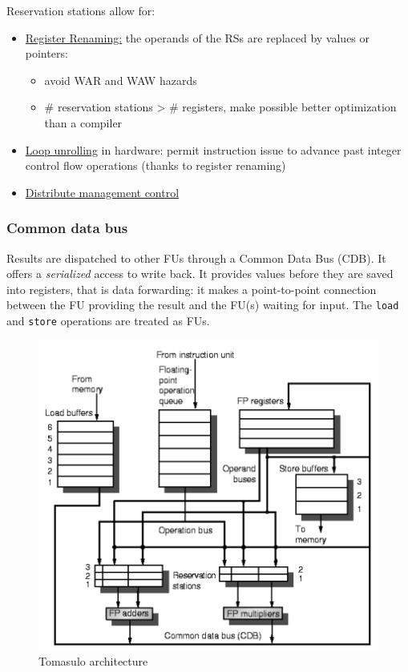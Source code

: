 Reservation stations allow for:
\begin{itemize}
    \item[\textrightarrow] \underline{Register Renaming:} the operands of the RSs are replaced by values or pointers:
    \begin{itemize}
        \item avoid WAR and WAW hazards
        \item \# reservation stations > \# registers, make possible better optimization than a compiler
    \end{itemize}
    \item[\textrightarrow] \underline{Loop unrolling} in hardware: permit instruction issue to advance past integer
    control flow operations (thanks to register renaming)
    \item[\textrightarrow] \underline{Distribute management control}
\end{itemize}

\subsubsection{Common data bus}
Results are dispatched to other FUs through a Common Data Bus (CDB).
It offers a \textit{serialized} access to write back.
It provides values before they are saved into registers, that is data forwarding: it makes a point-to-point connection
between the FU providing the result and the FU(s) waiting for input.
The \verb|load| and \verb|store| operations are treated as FUs.

\begin{figure}
    \centering
    \includegraphics[scale = 0.5]{images/tomasulo-architecture}
    \caption{Tomasulo architecture}
    \label{fig:tomasulo-architecture}
\end{figure}

